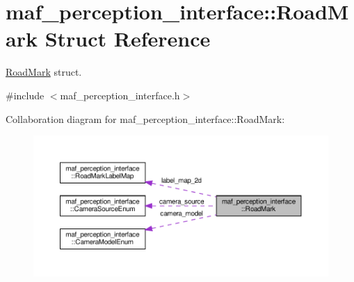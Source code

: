 \hypertarget{structmaf__perception__interface_1_1RoadMark}{}\section{maf\+\_\+perception\+\_\+interface\+:\+:Road\+Mark Struct Reference}
\label{structmaf__perception__interface_1_1RoadMark}


\hyperlink{structmaf__perception__interface_1_1RoadMark}{Road\+Mark} struct.  




{\ttfamily \#include $<$maf\+\_\+perception\+\_\+interface.\+h$>$}



Collaboration diagram for maf\+\_\+perception\+\_\+interface\+:\+:Road\+Mark\+:\nopagebreak
\begin{figure}[H]
\begin{center}
\leavevmode
\includegraphics[width=350pt]{structmaf__perception__interface_1_1RoadMark__coll__graph}
\end{center}
\end{figure}
